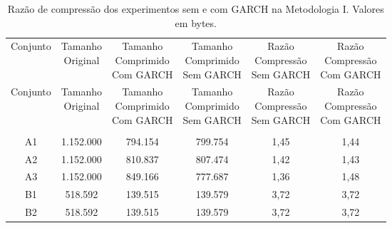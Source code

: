 \begin{center}
\begin{longtable}{cccccc}
\toprule
\rowcolor{white}
\caption[Metodologia I: Razão de compressão]{Razão de compressão dos
experimentos sem e com GARCH na Metodologia I.
Valores em bytes.} \label{Tab:razaocompressaoMet1} \\
\midrule
Conjunto & \specialcell{Tamanho \\Original} & \specialcell{Tamanho
\\Comprimido\\Com GARCH} & \specialcell{Tamanho
\\Comprimido\\Sem GARCH} & \specialcell{Razão \\Compressão
\\Sem GARCH} & \specialcell{Razão \\Compressão
\\Com GARCH} \\
\midrule
\endfirsthead
\midrule
\rowcolor{white}
Conjunto & \specialcell{Tamanho \\Original} & \specialcell{Tamanho
\\Comprimido\\Com GARCH} & \specialcell{Tamanho
\\Comprimido\\Sem GARCH} & \specialcell{Razão \\Compressão
\\Sem GARCH} & \specialcell{Razão \\Compressão
\\Com GARCH} \\
\toprule
\endhead
\midrule \\ %
\endfoot
\bottomrule
\endlastfoot
    A1    & 1.152.000 & 794.154 & 799.754 & 1,45  & 1,44 \\
    A2    & 1.152.000 & 810.837 & 807.474 & 1,42  & 1,43 \\
    A3    & 1.152.000 & 849.166 & 777.687 & 1,36  & 1,48 \\
    B1    & 518.592 & 139.515 & 139.579 & 3,72  & 3,72 \\
    B2    & 518.592 & 139.515 & 139.579 & 3,72  & 3,72 \\

\end{longtable}
\end{center}
